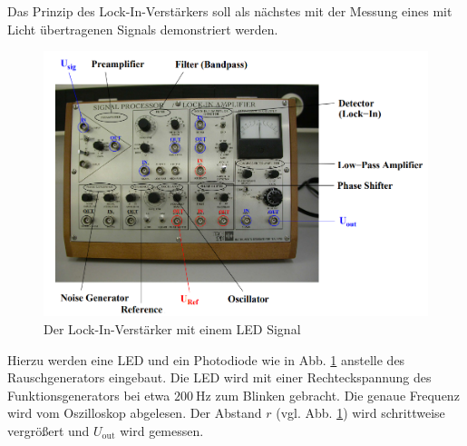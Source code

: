 Das Prinzip des Lock-In-Verstärkers soll als nächstes mit der Messung eines mit Licht übertragenen Signals demonstriert werden.
\begin{figure}
    \includegraphics[width=\textwidth]{Abbildungen/Aufbau.png}
    \caption{Der Lock-In-Verstärker mit einem LED Signal \cite[][]{man:v303}}
    \label{fig:Lock-In-LED}
\end{figure}
%
Hierzu werden eine LED und ein Photodiode wie in Abb. \ref{fig:Lock-In-LED} anstelle des Rauschgenerators eingebaut.
Die LED wird mit einer Rechteckspannung des Funktionsgenerators bei etwa $\qty{200}{\hertz}$ zum Blinken gebracht.
Die genaue Frequenz wird vom Oszilloskop abgelesen. 
Der Abstand $r$ (vgl. Abb. \ref{fig:Lock-In-LED}) wird schrittweise vergrößert und $U_\text{out}$ wird gemessen.
